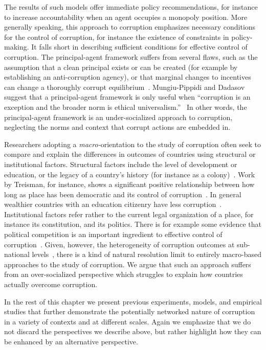 The results of such models offer immediate policy recommendations, for instance to increase accountability when an agent occupies a monopoly position. More generally speaking, this approach to corruption emphasizes necessary conditions for the control of corruption, for instance the existence of constraints in policy-making. It falls short in describing sufficient conditions for effective control of corruption. The principal-agent framework suffers from several flaws, such as the assumption that a clean principal exists or can be created (for example by establishing an anti-corruption agency), or that marginal changes to incentives can change a thoroughly corrupt equilibrium~\cite{persson2013anticorruption}. Mungiu-Pippidi and Dadasov suggest that a principal-agent framework is only useful when ``corruption is an exception and the broader norm is ethical universalism.''~\cite{mungiu2016measuring} In other words, the principal-agent framework is an under-socialized approach to corruption, neglecting the norms and context that corrupt actions are embedded in.

Researchers adopting a \textit{macro-}orientation to the study of corruption often seek to compare and explain the differences in outcomes of countries using structural or institutional factors. Structural factors include the level of development or education, or the legacy of a country's history (for instance as a colony)~\cite{acemoglu2002reversal}. Work by Treisman, for instance, shows a significant positive relationship between how long as place has been democratic and its control of corruption~\cite{treisman2000causes}. In general wealthier countries with an education citizenry have less corruption~\cite{treisman2007have}. Institutional factors refer rather to the current legal organization of a place, for instance its constitution, and its politics. There is for example some evidence that political competition is an important ingredient to effective control of corruption~\cite{broms2017procurement}. Given, however, the heterogeneity of corruption outcomes at sub-national levels~\cite{charron2014regional}, there is a kind of natural resolution limit to entirely macro-based approaches to the study of corruption. We argue that such an approach suffers from an over-socialized perspective which struggles to explain how countries actually overcome corruption.

In the rest of this chapter we present previous experiments, models, and empirical studies that further demonstrate the potentially networked nature of corruption in a variety of contexts and at different scales. Again we emphasize that we do not discard the perspectives we describe above, but rather highlight how they can be enhanced by an alternative perspective.

